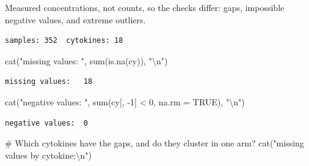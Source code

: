 \documentclass[
  letterpaper,
  DIV=11,
  numbers=noendperiod]{scrartcl}
\newenvironment{Shaded}{\begin{snugshade}}{\end{snugshade}}
\newcommand{\AttributeTok}[1]{\textcolor[rgb]{0.40,0.45,0.13}{#1}}
\newcommand{\CommentTok}[1]{\textcolor[rgb]{0.37,0.37,0.37}{#1}}
\newcommand{\ConstantTok}[1]{\textcolor[rgb]{0.56,0.35,0.01}{#1}}
\newcommand{\DecValTok}[1]{\textcolor[rgb]{0.68,0.00,0.00}{#1}}
\newcommand{\FunctionTok}[1]{\textcolor[rgb]{0.28,0.35,0.67}{#1}}
\newcommand{\NormalTok}[1]{\textcolor[rgb]{0.00,0.23,0.31}{#1}}
\newcommand{\OtherTok}[1]{\textcolor[rgb]{0.00,0.23,0.31}{#1}}
\newcommand{\SpecialCharTok}[1]{\textcolor[rgb]{0.37,0.37,0.37}{#1}}
\newcommand{\StringTok}[1]{\textcolor[rgb]{0.13,0.47,0.30}{#1}}
\begin{document}
Measured concentrations, not counts, so the checks differ: gaps,
impossible negative values, and extreme outliers.

\begin{Shaded}
\end{Shaded}

\begin{verbatim}
samples: 352  cytokines: 18 
\end{verbatim}

\begin{Shaded}
\begin{Highlighting}[]
\FunctionTok{cat}\NormalTok{(}\StringTok{"missing values:  "}\NormalTok{, }\FunctionTok{sum}\NormalTok{(}\FunctionTok{is.na}\NormalTok{(cy)), }\StringTok{"}\SpecialCharTok{\textbackslash{}n}\StringTok{"}\NormalTok{)}
\end{Highlighting}
\end{Shaded}

\begin{verbatim}
missing values:   18 
\end{verbatim}

\begin{Shaded}
\begin{Highlighting}[]
\FunctionTok{cat}\NormalTok{(}\StringTok{"negative values: "}\NormalTok{, }\FunctionTok{sum}\NormalTok{(cy[, }\SpecialCharTok{{-}}\DecValTok{1}\NormalTok{] }\SpecialCharTok{\textless{}} \DecValTok{0}\NormalTok{, }\AttributeTok{na.rm =} \ConstantTok{TRUE}\NormalTok{), }\StringTok{"}\SpecialCharTok{\textbackslash{}n}\StringTok{"}\NormalTok{)}
\end{Highlighting}
\end{Shaded}

\begin{verbatim}
negative values:  0 
\end{verbatim}

\begin{Shaded}
\begin{Highlighting}[]
\CommentTok{\# Which cytokines have the gaps, and do they cluster in one arm?}
\FunctionTok{cat}\NormalTok{(}\StringTok{"missing values by cytokine:}\SpecialCharTok{\textbackslash{}n}\StringTok{"}\NormalTok{)}
\end{Highlighting}
\end{Shaded}
\end{document}
